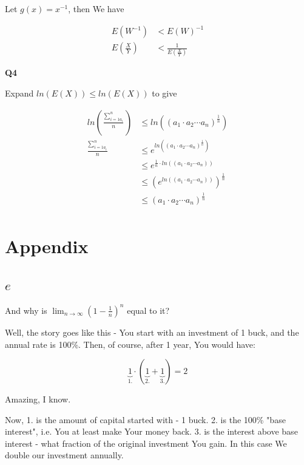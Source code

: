 \documentclass{article}
\newcommand\blankpage{%
    \null
    \thispagestyle{empty}%
    \addtocounter{page}{-1}%
    \newpage}
\begin{document}
			Let $g(x) = x^{-1}$, then We have
			
			\begin{align*}
			E(W^{-1}) &< E(W)^{-1} \\
			E\left(\frac{X}{Y}\right) &< \frac{1}{E\left(\frac{X}{Y} \right)}
			\end{align*}
			
			\hfill
			
		\textbf{Q4}
				
			Expand $ln(E(X)) \le ln(E(X))$ to give
			
			\begin{align*}
			ln\left( \frac{\sum^n_{i=1 a_i}}{n} \right) &\le ln\left( (a_1\cdot a_2\cdots a_n)^{\frac{1}{n}} \right)\\
			\frac{\sum^n_{i=1 a_i}}{n} &\le e^{ln\left( (a_1\cdot a_2\cdots a_n)^{\frac{1}{n}} \right)}\\
			&\le e^{\frac{1}{n}\cdot ln\left( (a_1\cdot a_2\cdots a_n) \right)}\\
			&\le (e^{ln\left( (a_1\cdot a_2\cdots a_n) \right)})^{\frac{1}{n}}\\
			&\le (a_1\cdot a_2\cdots a_n)^{\frac{1}{n}}\\
			\end{align*}			
			
			
			
			
			
			
			
			
			
			
			
			
\newpage
\blankpage
\blankpage
		
\section{Appendix}
	\subsection{$e$}
		And why is $\lim_{n\to\infty} \left(1-\frac{1}{n}\right)^n$ equal to it?
		
		Well, the story goes like this - You start with an investment of 1 buck, and the annual rate is 100\%. Then, of course, after 1 year, You would have:
		
		\[ \underbrace{1}_{1.}\cdot(\underbrace{1}_{2.}+\underbrace{1}_{3.}) = 2\]
		
		Amazing, I know. 
		
		Now, 1. is the amount of capital started with - 1 buck. 2. is the 100\% "base interest", i.e. You at least make Your money back. 3. is the interest above base interest - what fraction of the original investment You gain. In this case We double our investment annually.
		
\end{document}
